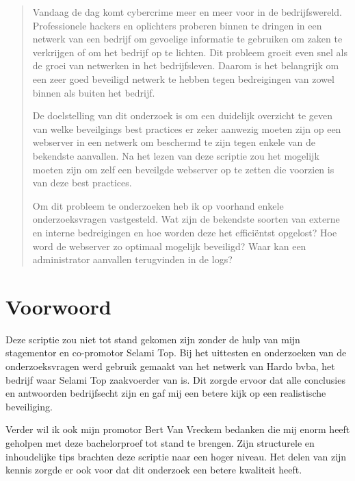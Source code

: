 \documentclass[pdftex,a4paper,12pt]{report}
\begin{document}
\begin{abstract}
Vandaag de dag komt cybercrime meer en meer voor in de bedrijfswereld. Professionele hackers en oplichters proberen binnen te dringen in een netwerk van een bedrijf om gevoelige informatie te gebruiken om zaken te verkrijgen of om het bedrijf op te lichten. Dit probleem groeit even snel als de groei van netwerken in het bedrijfsleven. Daarom is het belangrijk om een zeer goed beveiligd netwerk te hebben tegen bedreigingen van zowel binnen als buiten het bedrijf. \newline 

De doelstelling van dit onderzoek is om een duidelijk overzicht te geven van welke beveilgings best practices er zeker aanwezig moeten zijn op een webserver in een netwerk om beschermd te zijn tegen enkele van de bekendste aanvallen. Na het lezen van deze scriptie zou het mogelijk moeten zijn om zelf een beveilgde webserver op te zetten die voorzien is van deze best practices. \newline

Om dit probleem te onderzoeken heb ik op voorhand enkele onderzoeksvragen vastgesteld. Wat zijn de bekendste soorten van externe en interne bedreigingen en hoe worden deze het efficiëntst opgelost? Hoe word de webserver zo optimaal mogelijk beveiligd? Waar kan een administrator aanvallen terugvinden in de logs?
\end{abstract}

\chapter*{Voorwoord}
\label{ch:voorwoord}
Deze scriptie zou niet tot stand gekomen zijn zonder de hulp van mijn stagementor en co-promotor Selami Top. Bij het uittesten en onderzoeken van de onderzoeksvragen werd gebruik gemaakt van het netwerk van Hardo bvba, het bedrijf waar Selami Top zaakvoerder van is. Dit zorgde ervoor dat alle conclusies en antwoorden bedrijfsecht zijn en gaf mij een betere kijk op een realistische beveiliging. \newline

Verder wil ik ook mijn promotor Bert Van Vreckem bedanken die mij enorm heeft geholpen met deze bachelorproef tot stand te brengen. Zijn structurele en inhoudelijke tips brachten deze scriptie naar een hoger niveau. Het delen van zijn kennis zorgde er ook voor dat dit onderzoek een betere kwaliteit heeft. \newline
\end{document}
